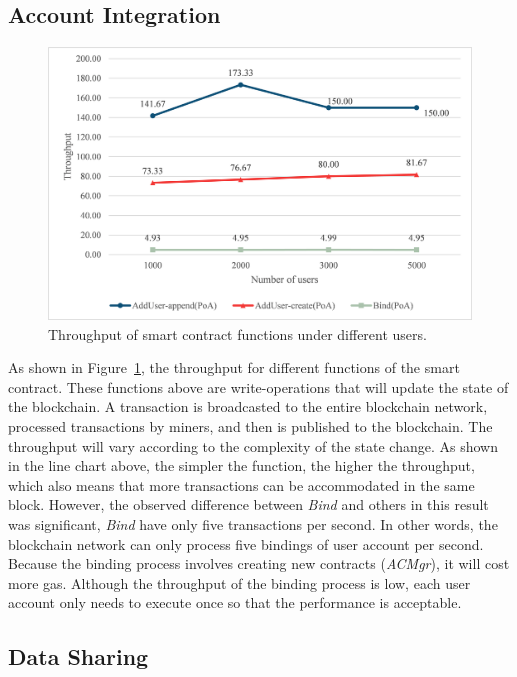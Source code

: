 \subsection*{Account Integration}
\begin{figure}[htb]
    \centering
    \includegraphics[height=!,width=1\linewidth,keepaspectratio=true]{figures/smart_contract_tps.png}
    \caption{{\footnotesize Throughput of smart contract functions under different users.}}
    \label{fig:contract_tps}
\end{figure}
As shown in Figure~\ref{fig:contract_tps}, the throughput for different functions of the smart contract. These functions above are write-operations that will update the state of the blockchain. A transaction is broadcasted to the entire blockchain network, processed transactions by miners, and then is published to the blockchain. The throughput will vary according to the complexity of the state change. As shown in the line chart above, the simpler the function, the higher the throughput, which also means that more transactions can be accommodated in the same block. However, the observed difference between \textit{Bind} and others in this result was significant, \textit{Bind} have only five transactions per second. In other words, the blockchain network can only process five bindings of user account per second. Because the binding process involves creating new contracts (\textit{ACMgr}), it will cost more gas. Although the throughput of the binding process is low, each user account only needs to execute once so that the performance is acceptable.

\newpage

\subsection*{Data Sharing}



